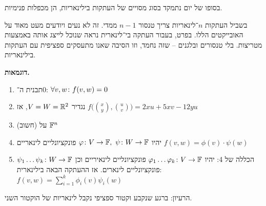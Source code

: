 \documentclass[]{../../../../tex/classes/styledArticle}
\begin{document}
    
    בסופו של יום נתמקד בסוג מסויים של העתקות בילינאריות, הן מכפלות פנימיות. 
    
    בשביל העתקות $n$־לינאריות צריך טנסור $n - 1$ ממדי. זה לא נעים ויודעים מעט מאוד על האובייקטים הללו. בפרט, בעבור העתקה בי־לינארית נראה שנוכל לייצג אותה באמצעות מטריצות. בלי טנסורים ובלגנים – שזה נחמד, וזו הסיבה שאנו מתעסקים ספציפית עם העתקות בילינאריות. 
    
    \textbf{דוגמאות. }
    \begin{enumerate}
        \item תבנית ה־$0$: \hfill $\forall v,w \colon f(v, w) = 0$ 
        \item נגדיר $V = W = \mathbb{R}^2$, אז \hfill $f\big(\binom{x}{y}, \binom{u}{v}\big) = 2xu + 5xv - 12yu$
        \item (חשוב)  על $\mathbb{F}^n$ 
        \item יהיו $\varphi \colon V \to \mathbb{F}, \ \psi \colon W \to \mathbb{F}$ פונקציונליים לינאריים \hfill $f(v, w) = \phi(v) \cdot \psi(w)$
        \item הכללה של 4: יהיו $\varphi_1 \dots \varphi_k \colon V \to \mathbb{F}$ פונקציונליים לינאיריים וכן $\psi_1 \dots \psi_k \colon W \to \mathbb{F}$ פונקציונליים לינארים. אז ההעתקה הבאה בילינארית: \hfill $f(v, w) = \sum_{i = 1}^{k}\phi_i(v) \psi_i(w)$
    \end{enumerate}
    הרעיון: ברגע שנקבע וקטור ספציפי נקבל לינאריות של הוקטור השני. 
    
\end{document}
